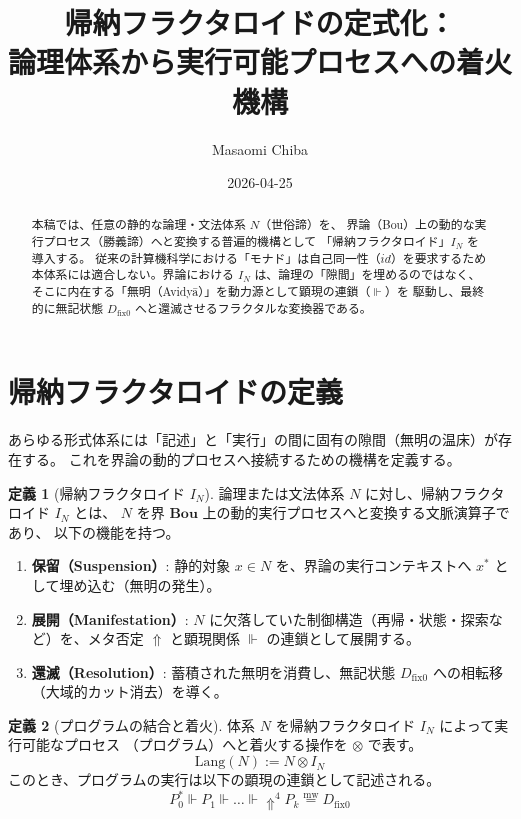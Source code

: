 \documentclass[11pt,a4paper]{article}
\theoremstyle{definition}
\newtheorem{definition}{定義}[section]
\newcommand{\dfix}{D_{\mathrm{fix}0}} %
\newcommand{\mweq}{\mathrel{\overset{\mathrm{mw}}{=}}}
\newcommand{\metanegation}{\Uparrow}
\newcommand{\susp}[1]{#1^*}
\newcommand{\entails}{\Vdash} %
\newcommand{\Bou}{\mathbf{Bou}}
\begin{document}
\title{帰納フラクタロイドの定式化：\\
論理体系から実行可能プロセスへの着火機構}
\author{Masaomi Chiba}
\date{2026-04-25}
\maketitle

\begin{abstract}
本稿では、任意の静的な論理・文法体系 $N$（世俗諦）を、
界論（Bou）上の動的な実行プロセス（勝義諦）へと変換する普遍的機構として
「帰納フラクタロイド」$I_N$ を導入する。
従来の計算機科学における「モナド」は自己同一性（$id$）を要求するため
本体系には適合しない。界論における $I_N$ は、論理の「隙間」を埋めるのではなく、
そこに内在する「無明（Avidy\=a）」を動力源として顕現の連鎖（$\entails$）を
駆動し、最終的に無記状態 $\dfix$ へと還滅させるフラクタルな変換器である。
\end{abstract}

\section{帰納フラクタロイドの定義}

あらゆる形式体系には「記述」と「実行」の間に固有の隙間（無明の温床）が存在する。
これを界論の動的プロセスへ接続するための機構を定義する。

\begin{definition}[帰納フラクタロイド $I_N$]
論理または文法体系 $N$ に対し、帰納フラクタロイド $I_N$ とは、
$N$ を界 $\Bou$ 上の動的実行プロセスへと変換する文脈演算子であり、
以下の機能を持つ。
\begin{enumerate}
    \item \textbf{保留（Suspension）}: 静的対象 $x \in N$ を、界論の実行コンテキストへ $\susp{x}$ として埋め込む（無明の発生）。
    \item \textbf{展開（Manifestation）}: $N$ に欠落していた制御構造（再帰・状態・探索など）を、メタ否定 $\metanegation$ と顕現関係 $\entails$ の連鎖として展開する。
    \item \textbf{還滅（Resolution）}: 蓄積された無明を消費し、無記状態 $\dfix$ への相転移（大域的カット消去）を導く。
\end{enumerate}
\end{definition}

\begin{definition}[プログラムの結合と着火]
体系 $N$ を帰納フラクタロイド $I_N$ によって実行可能なプロセス
（プログラム）へと着火する操作を $\otimes$ で表す。
$$ \text{Lang}(N) := N \otimes I_N $$
このとき、プログラムの実行は以下の顕現の連鎖として記述される。
$$ \susp{P_0} \entails P_1 \entails \dots \entails \metanegation^4 P_k \mweq \dfix $$
\end{definition}
\end{document}
